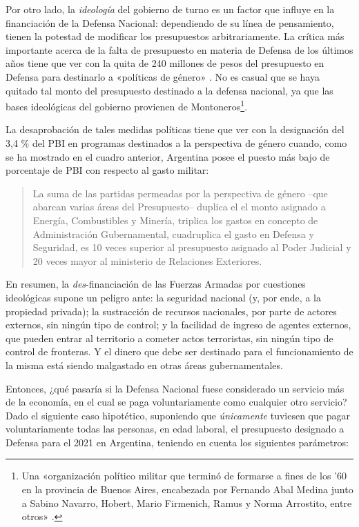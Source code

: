 \documentclass[12pt,a4paper,twoside]{book}
\begin{document}
Por otro lado, la \textit{ideología} del gobierno de turno es un factor que influye en la financiación de la Defensa Nacional: dependiendo de su línea de pensamiento, tienen la potestad de modificar los presupuestos arbitrariamente. La crítica más importante acerca de la falta de presupuesto en materia de Defensa de los últimos años tiene que ver con la quita de 240 millones de pesos del presupuesto en Defensa para destinarlo a «políticas de género» \cite{defensanac:perspec-genero}. No es casual que se haya quitado tal monto del presupuesto destinado a la defensa nacional, ya que las bases ideológicas del gobierno provienen de Montoneros\footnote{Una «organización político militar que terminó de formarse a fines de los '60 en la provincia de Buenos Aires, encabezada por Fernando Abal Medina junto a Sabino Navarro, Hobert, Mario Firmenich, Ramus y Norma Arrostito, entre otros» \cite[pág. 76]{jovenesidealistas}.}.

La desaprobación de tales medidas políticas tiene que ver con la designación del 3,4 \% del PBI en programas destinados a la perspectiva de género cuando, como se ha mostrado en el cuadro anterior, Argentina posee el puesto más bajo de porcentaje de PBI con respecto al gasto militar:

\begin{quotation}
La suma de las partidas permeadas por la perspectiva de género –que abarcan varias áreas del Presupuesto– duplica el el monto asignado a Energía, Combustibles y Minería, triplica los gastos en concepto de Administración Gubernamental, cuadruplica el gasto en Defensa y Seguridad, es 10 veces superior al presupuesto asignado al Poder Judicial y 20 veces mayor al ministerio de Relaciones Exteriores. \cite{defensanac:perspec-genero2}
\end{quotation}

En resumen, la \textit{des}-financiación de las Fuerzas Armadas por cuestiones ideológicas supone un peligro ante: la seguridad nacional (y, por ende, a la propiedad privada); la sustracción de recursos nacionales, por parte de actores externos, sin ningún tipo de control; y la facilidad de ingreso de agentes externos, que pueden entrar al territorio a cometer actos terroristas, sin ningún tipo de control de fronteras. Y el dinero que debe ser destinado para el funcionamiento de la misma está siendo malgastado en otras áreas gubernamentales.

Entonces, ¿qué pasaría si la Defensa Nacional fuese considerado un servicio más de la economía, en el cual se paga voluntariamente como cualquier otro servicio? Dado el siguiente caso hipotético, suponiendo que \textit{únicamente} tuviesen que pagar voluntariamente todas las personas, en edad laboral, el presupuesto designado a Defensa para el 2021 en Argentina, teniendo en cuenta los siguientes parámetros:
\end{document}
